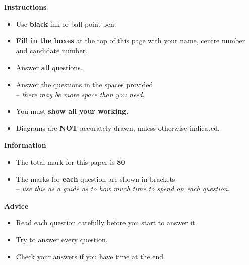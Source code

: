 \documentclass[a4paper,12pt]{article}
\begin{document}
{\begin{center}
\end{center}

{\small
\begin{adjustwidth}{1.5cm}{1.5cm}

  {\large\bfseries Instructions\par}
  \begin{itemize}[%
      left=1em,
      label=\textbullet,
      topsep=0pt, 
      partopsep=0pt,
      parsep=0pt, 
      itemsep=0pt
    ]
    \item Use \textbf{black} ink or ball‐point pen.
    \item \textbf{Fill in the boxes} at the top of this page with your name, centre number and candidate number.
    \item Answer \textbf{all} questions.
    \item Answer the questions in the spaces provided\\
          \hspace*{1em}-- \textit{there may be more space than you need}.
    \item You must \textbf{show all your working}.
    \item Diagrams are \textbf{NOT} accurately drawn, unless otherwise indicated.
  \end{itemize}

  \vspace{0.5em}
  {\large\bfseries Information\par}
  \begin{itemize}[%
      left=1em,
      label=\textbullet,
      topsep=0pt, 
      partopsep=0pt,
      parsep=0pt, 
      itemsep=0pt
    ]
    \item The total mark for this paper is \textbf{80}
    \item The marks for \textbf{each} question are shown in brackets\\
          \hspace*{1em}-- \textit{use this as a guide as to how much time to spend on each question}.
  \end{itemize}

  \vspace{0.5em} 
  {\large\bfseries Advice\par}
  \begin{itemize}[%
      left=1em,
      label=\textbullet,
      topsep=0pt, 
      partopsep=0pt,
      parsep=0pt, 
      itemsep=0pt
    ]
    \item Read each question carefully before you start to answer it.
    \item Try to answer every question.
    \item Check your answers if you have time at the end.
  \end{itemize}
\end{adjustwidth}
}
}%


\end{document}
